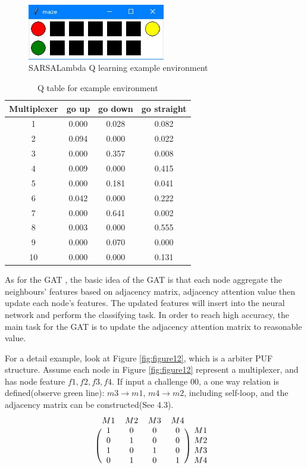 \begin{figure}[htp]
    \centering
    \includegraphics[width=6cm]{figures/figure11.jpg}
    \caption{SARSALambda Q learning example environment}
    \label{fig:figure11}
    \end{figure}

\begin{table}[ht]
    \center
    \begin{tabular}{c|ccc}
    Multiplexer & go up & go down & go straight\\
    \hline
    1 & 0.000 & 0.028 & 0.082\\
    2 & 0.094 & 0.000 & 0.022\\
    3 & 0.000 & 0.357 & 0.008\\
    4 & 0.009 & 0.000 & 0.415\\
    5 & 0.000 & 0.181 & 0.041\\
    6 & 0.042 & 0.000 & 0.222\\
    7 & 0.000 & 0.641 & 0.002\\
    8 & 0.003 & 0.000 & 0.555\\
    9 & 0.000 & 0.070 & 0.000\\
    10 & 0.000 & 0.000 & 0.131\\
    \end{tabular}
    \caption{Q table for example environment}
    \label{tab:table1}
    \end{table}

As for the GAT \cite{Reference10}, the basic idea of the GAT is that each node aggregate the neighbours’ features based on adjacency matrix, adjacency attention value then update each node's features. 
The updated features will insert into the neural network and perform the classifying task. In order to reach high accuracy, the main task for the GAT is to update the adjacency attention matrix to
reasonable value.

For a detail example, look at Figure \ref{fig:figure12}, which is a arbiter PUF structure. Assume each node in Figure \ref{fig:figure12} represent a multiplexer, and has node feature $f1,f2,f3,f4$. If input a 
challenge 00, a one way relation is defined(observe green line): 
$m3 \rightarrow m1$, $m4 \rightarrow m2$, including self-loop, and the adjacency matrix can be constructed(See 4.3). 
\begin{equation}
    \begin{blockarray}{ccccc}
    M1 & M2 & M3 & M4\\
    \begin{block}{(cccc)c}
        1 & 0 & 0 & 0 & M1\\
        0 & 1 & 0 & 0 & M2\\
        1 & 0 & 1 & 0 & M3\\
        0 & 1 & 0 & 1 & M4\\
    \end{block}
    \end{blockarray}
    \label{matrix}
\end{equation}

